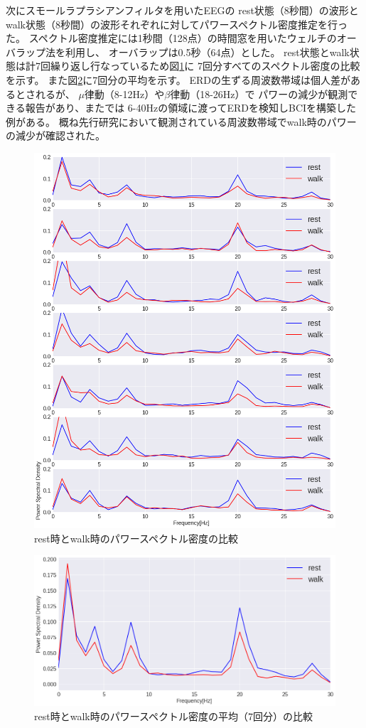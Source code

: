 次にスモールラプラシアンフィルタを用いたEEGの
rest状態（8秒間）の波形とwalk状態（8秒間）の波形それぞれに対してパワースペクトル密度推定を行った。
スペクトル密度推定には1秒間（128点）の時間窓を用いたウェルチのオーバラップ法を利用し、
オーバラップは0.5秒（64点）とした。
rest状態とwalk状態は計7回繰り返し行なっているため図\ref{fig:allERDs}に
7回分すべてのスペクトル密度の比較を示す。
また図\ref{fig:walkERD}に7回分の平均を示す。
ERDの生ずる周波数帯域は個人差があるとされるが、
\(\mu\)律動（8-12Hz）や\(\beta\)律動（18-26Hz）で
パワーの減少が観測できる報告があり\cite{erdfreq}、また\cite{Beta波によるBCI}では
6-40Hzの領域に渡ってERDを検知しBCIを構築した例がある。
概ね先行研究において観測されている周波数帯域でwalk時のパワーの減少が確認された。
\begin{figure}
    \centering
    \includegraphics[width=13cm]{images/allERDs}
    \caption{rest時とwalk時のパワースペクトル密度の比較}
    \label{fig:allERDs}
\end{figure}
\begin{figure}
    \centering
    \includegraphics[width=13cm]{images/walkERD}
    \caption{rest時とwalk時のパワースペクトル密度の平均（7回分）の比較}
    \label{fig:walkERD}
\end{figure}

